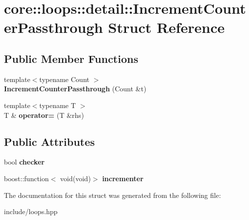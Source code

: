 \hypertarget{structcore_1_1loops_1_1detail_1_1_increment_counter_passthrough}{\section{core\-:\-:loops\-:\-:detail\-:\-:Increment\-Counter\-Passthrough Struct Reference}
\label{structcore_1_1loops_1_1detail_1_1_increment_counter_passthrough}
}
\subsection*{Public Member Functions}
\begin{DoxyCompactItemize}
\item 
\hypertarget{structcore_1_1loops_1_1detail_1_1_increment_counter_passthrough_adc1dabac4b5031782ad1d27eaadbf357}{{\footnotesize template$<$typename Count $>$ }\\{\bfseries Increment\-Counter\-Passthrough} (Count \&t)}\label{structcore_1_1loops_1_1detail_1_1_increment_counter_passthrough_adc1dabac4b5031782ad1d27eaadbf357}

\item 
\hypertarget{structcore_1_1loops_1_1detail_1_1_increment_counter_passthrough_ad654e7dfedb95e67c4e67de299e5464a}{{\footnotesize template$<$typename T $>$ }\\T \& {\bfseries operator=} (T \&rhs)}\label{structcore_1_1loops_1_1detail_1_1_increment_counter_passthrough_ad654e7dfedb95e67c4e67de299e5464a}

\end{DoxyCompactItemize}
\subsection*{Public Attributes}
\begin{DoxyCompactItemize}
\item 
\hypertarget{structcore_1_1loops_1_1detail_1_1_increment_counter_passthrough_ae392a067b9bd256a5725f6b33caa42f5}{bool {\bfseries checker}}\label{structcore_1_1loops_1_1detail_1_1_increment_counter_passthrough_ae392a067b9bd256a5725f6b33caa42f5}

\item 
\hypertarget{structcore_1_1loops_1_1detail_1_1_increment_counter_passthrough_a32a129f24b49d523ff5d9d8f0e3ec964}{boost\-::function$<$ void(void)$>$ {\bfseries incrementer}}\label{structcore_1_1loops_1_1detail_1_1_increment_counter_passthrough_a32a129f24b49d523ff5d9d8f0e3ec964}

\end{DoxyCompactItemize}


The documentation for this struct was generated from the following file\-:\begin{DoxyCompactItemize}
\item 
include/loops.\-hpp\end{DoxyCompactItemize}
